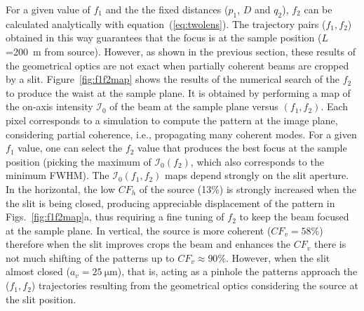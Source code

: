 \documentclass[9pt,twocolumn,twoside]{osajnl}
\begin{document}
For a given value of $f_1$ and the the fixed distances ($p_1$, $D$ and $q_2$), $f_2$ can be calculated analytically with equation~(\ref{eq:twolens}). The trajectory pairs ($f_1,f_2$) obtained in this way  
guarantees that the focus is at the sample position ($L$=\SI{200}{\meter} from source). However, as shown in the previous section, these results of the geometrical optics are not exact when partially coherent beams are cropped by a slit. 
Figure~\ref{fig:f1f2map} shows the results of the numerical search of the $f_2$ to produce the waist at the sample plane. It is obtained by performing a map of the on-axis intensity $\mathcal{I}_0$ of the beam at the sample plane versus $(f_1,f_2)$. Each pixel corresponds to a simulation to compute the pattern at the image plane, considering partial coherence, i.e., propagating many coherent modes. For a given $f_1$ value, one can select the $f_2$ value that produces the best focus at the sample position (picking the maximum of $\mathcal{I}_0(f_2)$, which also corresponds to the minimum FWHM). 
The $\mathcal{I}_0(f_1,f_2)$ maps depend strongly on the slit aperture. In the horizontal, the low $CF_h$ of the source (13\%) is strongly increased when the the slit is being closed, producing appreciable displacement of the pattern in Figs.~\ref{fig:f1f2map}a, thus requiring a fine tuning of $f_2$ to keep the beam focused at the sample plane. In vertical, the source is more coherent ($CF_v=58\%$) therefore when the slit improves crops the beam and enhances the $CF_v$ there is not much shifting of the patterns up to $CF_v \approx 90\%$. However, when the slit almost closed ($a_v=\SI{25}{\micro\meter}$), that is, acting as a pinhole the patterns approach the ($f_1,f_2$) trajectories resulting from the geometrical optics considering the source at the slit position.





\end{document}
